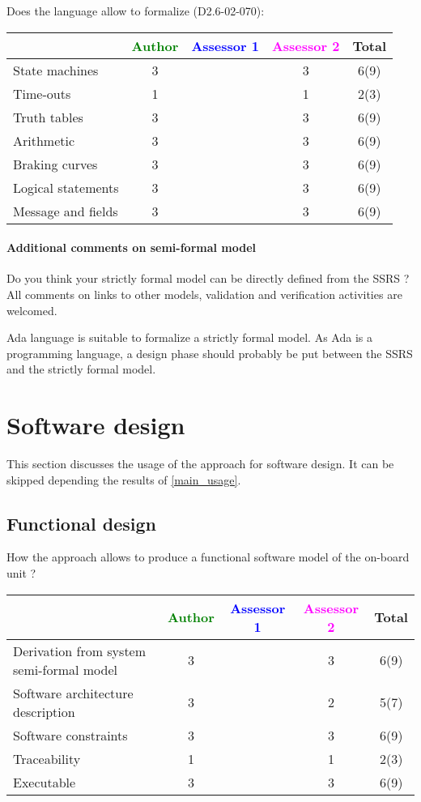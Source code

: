 Does the language allow to  formalize (D2.6-02-070):

\begin{tabular}{|l | c | c | c | c|}
\hline
& \textcolor{green}{Author} & \textcolor{blue}{Assessor 1} & \textcolor{magenta}{Assessor 2} & Total \\
\hline 
State machines  & 3     & & 3     &  6(9) \\
\hline
Time-outs  & 1     & & 1     &  2(3) \\
\hline
Truth tables  & 3     & & 3     &  6(9) \\
\hline
Arithmetic  & 3     & & 3     &  6(9) \\
\hline
Braking curves  & 3     & & 3     &  6(9) \\
\hline
Logical statements & 3     & & 3     &  6(9) \\
\hline
Message and fields & 3     & & 3     &  6(9) \\
\hline
\end{tabular}

\paragraph{Additional comments on semi-formal  model} Do you think your strictly formal  model can be directly defined from the SSRS ?
All comments on links to  other models, validation and verification activities are welcomed.

Ada language is suitable to formalize a strictly formal model. As Ada
is a programming language, a design phase should probably be put
between the SSRS and the strictly formal model.

\section{Software design}
This section discusses the usage of the approach for software design.
It can be skipped depending the results of \ref{main_usage}.

\subsection{Functional design}

How the approach allows to  produce a functional software model of the on-board unit ?

\begin{tabular}{|l | c | c | c | c|}
\hline
& \textcolor{green}{Author} & \textcolor{blue}{Assessor 1} & \textcolor{magenta}{Assessor 2} & Total \\
\hline
Derivation from system semi-formal model  & 3     & & 3     &  6(9) \\
\hline 
Software architecture description  & 3     & & 2   &  5(7)  \\
\hline
Software constraints  & 3     & & 3     &  6(9) \\
\hline
Traceability  & 1     & & 1     &  2(3) \\
\hline
Executable  & 3     & & 3     &  6(9) \\
\hline
\end{tabular}

